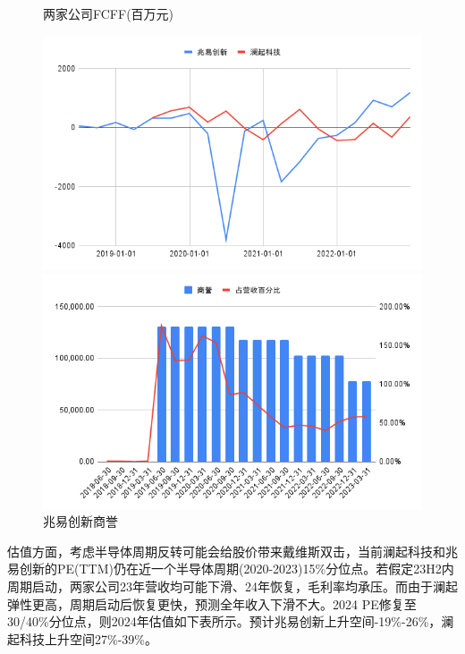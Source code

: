 \documentclass[a4paper,12pt]{ctexart}
\begin{document}
\begin{figure}[H]
    \begin{minipage}{0.48\linewidth}
        \caption{两家公司FCFF(百万元)}
        \centering
        \includegraphics[width=\linewidth]{img/fcf.png}
    \end{minipage}
    \begin{minipage}{0.48\linewidth}
        \caption{兆易创新商誉}
        \centering
        \includegraphics[width=\linewidth]{img/goodwill.png}
    \end{minipage}
\end{figure}
估值方面，考虑半导体周期反转可能会给股价带来戴维斯双击，当前澜起科技和兆易创新的PE(TTM)仍在近一个半导体周期(2020-2023)15\%分位点。若假定23H2内周期启动，两家公司23年营收均可能下滑、24年恢复，毛利率均承压。而由于澜起弹性更高，周期启动后恢复更快，预测全年收入下滑不大。2024 PE修复至30/40\%分位点，则2024年估值如下表所示。预计兆易创新上升空间-19\%-26\%，澜起科技上升空间27\%-39\%。
\end{document}
